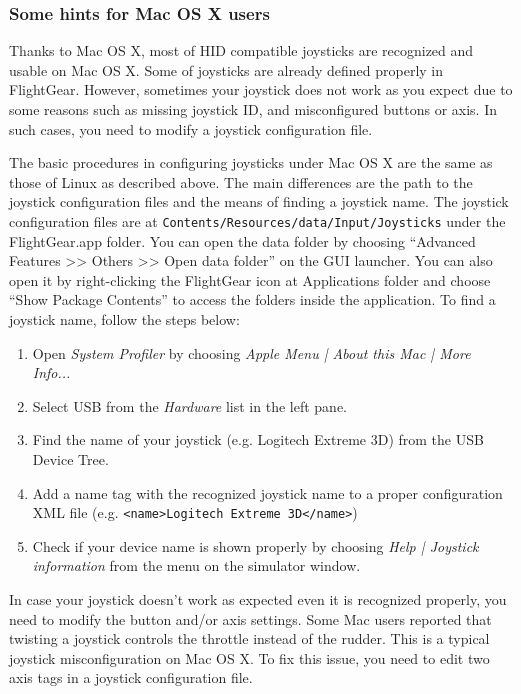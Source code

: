 \subsubsection{Some hints for Mac OS X users\label{joymac}}
Thanks to Mac OS X, most of HID compatible joysticks are recognized and usable on Mac OS X. Some of joysticks are already defined properly in FlightGear. However, sometimes your joystick does not work as you expect due to some reasons such as missing joystick ID, and misconfigured buttons or axis. In such cases, you need to modify a joystick configuration file.

The basic procedures in configuring joysticks under Mac OS X are the same as those of Linux as described above. The main differences are the path to the joystick configuration files and the means of finding a joystick name. The joystick configuration files are at \texttt{Contents/Resources/data/Input/Joysticks} under the FlightGear.app folder. You can open the data folder by choosing ``Advanced Features >> Others >> Open data folder'' on the GUI launcher. You can also open it by right-clicking the FlightGear icon at Applications folder and choose ``Show Package Contents'' to access the folders inside the application. To find a joystick name, follow the steps below:

\begin{enumerate}
\item Open \textit{System Profiler} by choosing \textit{Apple Menu | About this Mac | More Info...}
\item Select USB from the \textit{Hardware} list in the left pane.
\item Find the name of your joystick (e.g. Logitech Extreme 3D) from the USB Device Tree.
\item Add a name tag with the recognized joystick name to a proper configuration XML file (e.g. \verb=<name>Logitech Extreme 3D</name>=)
\item Check if your device name is shown properly by choosing \textit{Help | Joystick information} from the menu on the \FlightGear{} simulator window.
\end{enumerate}

In case your joystick doesn't work as expected even it is recognized properly, you need to modify the button and/or axis settings. Some Mac users reported that twisting a joystick controls the throttle instead of the rudder. This is a typical joystick misconfiguration on Mac OS X. To fix this issue, you need to edit two axis tags in a joystick configuration file. 

